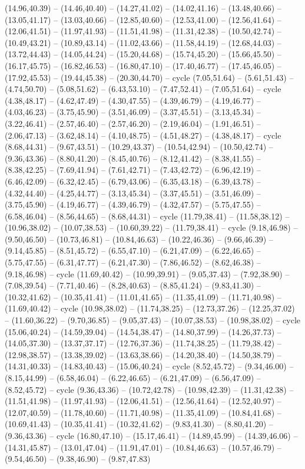 {(14.96,40.39) -- (14.46,40.40) -- (14.27,41.02) -- (14.02,41.16) -- (13.48,40.66) -- (13.05,41.17) -- (13.03,40.66) -- (12.85,40.60) -- (12.53,41.00) -- (12.56,41.64) -- (12.06,41.51) -- (11.97,41.93) -- (11.51,41.98) -- (11.31,42.38) -- (10.50,42.74) -- (10.49,43.21) -- (10.89,43.14) -- (11.02,43.66) -- (11.58,44.19) -- (12.68,44.03) -- (13.72,44.43) -- (14.05,44.24) -- (15.20,44.68) -- (15.74,45.20) -- (15.66,45.50) -- (16.17,45.75) -- (16.82,46.53) -- (16.80,47.10) -- (17.40,46.77) -- (17.45,46.05) -- (17.92,45.53) -- (19.44,45.38) -- (20.30,44.70) -- cycle (7.05,51.64) -- (5.61,51.43) -- (4.74,50.70) -- (5.08,51.62) -- (6.43,53.10) -- (7.47,52.41) -- (7.05,51.64) -- cycle (4.38,48.17) -- (4.62,47.49) -- (4.30,47.55) -- (4.39,46.79) -- (4.19,46.77) -- (4.03,46.23) -- (3.75,45.90) -- (3.51,46.09) -- (3.37,45.51) -- (3.13,45.34) -- (3.22,46.41) -- (2.57,46.40) -- (2.57,46.20) -- (2.19,46.04) -- (1.91,46.51) -- (2.06,47.13) -- (3.62,48.14) -- (4.10,48.75) -- (4.51,48.27) -- (4.38,48.17) -- cycle (8.68,44.31) -- (9.67,43.51) -- (10.29,43.37) -- (10.54,42.94) -- (10.50,42.74) -- (9.36,43.36) -- (8.80,41.20) -- (8.45,40.76) -- (8.12,41.42) -- (8.38,41.55) -- (8.38,42.25) -- (7.69,41.94) -- (7.61,42.71) -- (7.43,42.72) -- (6.96,42.19) -- (6.46,42.09) -- (6.32,42.45) -- (6.79,43.06) -- (6.35,43.18) -- (6.39,43.78) -- (4.32,44.40) -- (4.25,44.77) -- (3.13,45.34) -- (3.37,45.51) -- (3.51,46.09) -- (3.75,45.90) -- (4.19,46.77) -- (4.39,46.79) -- (4.32,47.57) -- (5.75,47.55) -- (6.58,46.04) -- (8.56,44.65) -- (8.68,44.31) -- cycle (11.79,38.41) -- (11.58,38.12) -- (10.96,38.02) -- (10.07,38.53) -- (10.60,39.22) -- (11.79,38.41) -- cycle (9.18,46.98) -- (9.50,46.50) -- (10.73,46.81) -- (10.84,46.63) -- (10.22,46.36) -- (9.66,46.39) -- (9.14,45.85) -- (8.51,45.72) -- (6.55,47.10) -- (6.21,47.09) -- (6.22,46.65) -- (5.75,47.55) -- (6.31,47.77) -- (6.21,47.30) -- (7.86,46.52) -- (8.62,46.38) -- (9.18,46.98) -- cycle (11.69,40.42) -- (10.99,39.91) -- (9.05,37.43) -- (7.92,38.90) -- (7.08,39.54) -- (7.71,40.46) -- (8.28,40.63) -- (8.85,41.24) -- (9.83,41.30) -- (10.32,41.62) -- (10.35,41.41) -- (11.01,41.65) -- (11.35,41.09) -- (11.71,40.98) -- (11.69,40.42) -- cycle (10.98,38.02) -- (11.74,38.25) -- (12.73,37.26) -- (12.25,37.02) -- (11.60,36.22) -- (9.70,36.85) -- (9.05,37.43) -- (10.07,38.53) -- (10.98,38.02) -- cycle (15.06,40.24) -- (14.59,39.04) -- (14.54,38.47) -- (14.80,37.99) -- (14.26,37.73) -- (14.05,37.30) -- (13.37,37.17) -- (12.76,37.36) -- (11.74,38.25) -- (11.79,38.42) -- (12.98,38.57) -- (13.38,39.02) -- (13.63,38.66) -- (14.20,38.40) -- (14.50,38.79) -- (14.31,40.33) -- (14.83,40.43) -- (15.06,40.24) -- cycle (8.52,45.72) -- (9.34,46.00) -- (8.15,44.99) -- (6.58,46.04) -- (6.22,46.65) -- (6.21,47.09) -- (6.56,47.09) -- (8.52,45.72) -- cycle (9.36,43.36) -- (10.72,42.78) -- (10.98,42.39) -- (11.31,42.38) -- (11.51,41.98) -- (11.97,41.93) -- (12.06,41.51) -- (12.56,41.64) -- (12.52,40.97) -- (12.07,40.59) -- (11.78,40.60) -- (11.71,40.98) -- (11.35,41.09) -- (10.84,41.68) -- (10.69,41.43) -- (10.35,41.41) -- (10.32,41.62) -- (9.83,41.30) -- (8.80,41.20) -- (9.36,43.36) -- cycle (16.80,47.10) -- (15.17,46.41) -- (14.89,45.99) -- (14.39,46.06) -- (14.31,45.87) -- (13.01,47.04) -- (11.91,47.01) -- (10.84,46.63) -- (10.57,46.79) -- (9.54,46.50) -- (9.38,46.90) -- (9.87,47.83) }
